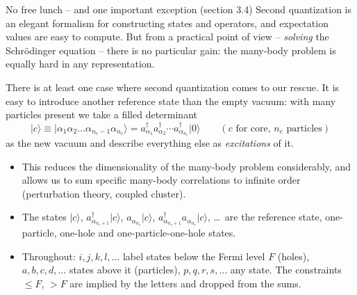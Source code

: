 \documentclass[aspectratio=169,10pt]{beamer}
\newcommand{\ket}[1]{\vert #1\rangle}
\begin{document}
\begin{frame}{No free lunch -- and one important exception (section 3.4)}
  Second quantization is an elegant formalism for constructing states and operators, and expectation values are easy to compute. But from a practical point of view -- \emph{solving} the Schr\"odinger equation -- there is no particular gain: the many-body problem is equally hard in any representation.
  \vspace{0.3em}

  There is at least one case where second quantization comes to our rescue. It is easy to introduce \alert{another reference state than the empty vacuum}: with many particles present we take a filled determinant
  \[
    \ket{c}\equiv\ket{\alpha_1\alpha_2\dots\alpha_{n_c-1}\alpha_{n_c}}
    =a_{\alpha_1}^{\dagger}a_{\alpha_2}^{\dagger}\cdots a_{\alpha_{n_c}}^{\dagger}\ket{0}
    \qquad(c\text{ for core, }n_c\text{ particles})
  \]
  as the new vacuum and describe everything else as \emph{excitations} of it.
  \begin{itemize}
    \item This reduces the dimensionality of the many-body problem considerably, and allows us to sum specific many-body correlations to infinite order (perturbation theory, coupled cluster).
    \item The states $\ket{c}$, $a_{\alpha_{n_c+1}}^{\dagger}\ket{c}$, $a_{\alpha_{n_c}}\ket{c}$, $a_{\alpha_{n_c+1}}^{\dagger}a_{\alpha_{n_c}}\ket{c}$, \dots\ are the reference state, one-particle, one-hole and one-particle-one-hole states.
    \item Throughout: $i,j,k,l,\dots$ label states \alert{below} the Fermi level $F$ (holes), $a,b,c,d,\dots$ states \alert{above} it (particles), $p,q,r,s,\dots$ any state. The constraints $\le F$, $>F$ are implied by the letters and dropped from the sums.
  \end{itemize}
\end{frame}
\end{document}
